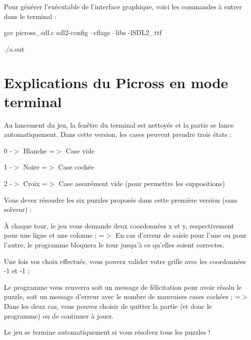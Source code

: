 Pour générer l'exécutable de l'interface graphique, voici les commandes à entrer dans le terminal \+:


\begin{DoxyItemize}
\item gcc picross\+\_\+sdl.\+c sdl2-\/config --cflags --libs -\/l\+S\+D\+L2\+\_\+ttf
\item ./a.out
\end{DoxyItemize}

\section*{Explications du Picross en mode terminal}

Au lancement du jeu, la fenêtre du terminal est nettoyée et la partie se lance automatiquement. Dans cette version, les cases peuvent prendre trois états \+:


\begin{DoxyItemize}
\item 0 -\/$>$ Blanche =$>$ Case vide
\item 1 -\/$>$ Noire =$>$ Case cochée
\item 2 -\/$>$ Croix =$>$ Case assurément vide (pour permettre les suppositions)
\end{DoxyItemize}

Vous devez résoudre les six puzzles proposés dans cette première version (sans solveur) \+:


\begin{DoxyItemize}
\item À chaque tour, le jeu vous demande deux coordonnées x et y, respectivement pour une ligne et une colonne ; =$>$ En cas d'erreur de saisie pour l'une ou pour l'autre, le programme bloquera le tour jusqu'à ce qu'elles soient correctes.
\item Une fois vos choix effectués, vous pouvez valider votre grille avec les coordonnées -\/1 et -\/1 ;
\item Le programme vous renverra soit un message de félicitation pour avoir résolu le puzzle, soit un message d'erreur avec le nombre de mauvaises cases cochées ; =$>$ Dans les deux cas, vous pouvez choisir de quitter la partie (et donc le programme) ou de continuer à jouer.
\item Le jeu se termine automatiquement si vous résolvez tous les puzzles ! 
\end{DoxyItemize}